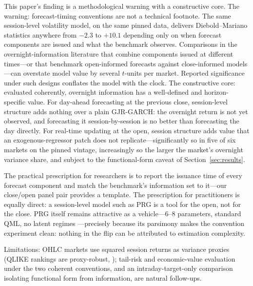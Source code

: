 \documentclass[11pt,a4paper]{article}
\begin{document}
This paper's finding is a methodological warning with a constructive core. The warning: forecast-timing conventions are not a technical footnote. The same session-level volatility model, on the same pinned data, delivers Diebold--Mariano statistics anywhere from $-2.3$ to $+10.1$ depending only on when forecast components are issued and what the benchmark observes. Comparisons in the overnight-information literature \citep[e.g.,][]{Tsiakas2008,Todorova2014} that combine components issued at different times---or that benchmark open-informed forecasts against close-informed models---can overstate model value by several $t$-units per market. Reported significance under such designs conflates the model with the clock. The constructive core: evaluated coherently, overnight information has a well-defined and horizon-specific value. For day-ahead forecasting at the previous close, session-level structure adds nothing over a plain GJR-GARCH: the overnight return is not yet observed, and forecasting it session-by-session is no better than forecasting the day directly. For real-time updating at the open, session structure adds value that an exogenous-regressor patch does not replicate---significantly so in five of six markets on the pinned vintage, increasingly so the larger the market's overnight variance share, and subject to the functional-form caveat of Section~\ref{sec:results}.

The practical prescription for researchers is to report the issuance time of every forecast component and match the benchmark's information set to it---our close/open panel pair provides a template. The prescription for practitioners is equally direct: a session-level model such as PRG is a tool for the open, not for the close. PRG itself remains attractive as a vehicle---6--8 parameters, standard QML, no latent regimes \citep{Lai2024,Haas2004}---precisely because its parsimony makes the convention experiment clean: nothing in the flip can be attributed to estimation complexity.

Limitations: OHLC markets use squared session returns as variance proxies (QLIKE rankings are proxy-robust, \citealp{Patton2011}); tail-risk and economic-value evaluation under the two coherent conventions, and an intraday-target-only comparison isolating functional form from information, are natural follow-ups.


\end{document}
